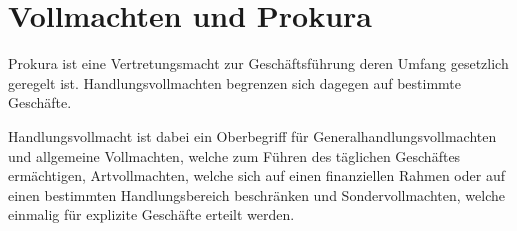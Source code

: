 \section{Vollmachten und Prokura}

Prokura ist eine Vertretungsmacht zur Geschäftsführung deren Umfang gesetzlich geregelt ist. Handlungsvollmachten begrenzen sich dagegen auf bestimmte Geschäfte.

Handlungsvollmacht ist dabei ein Oberbegriff für Generalhandlungsvollmachten und allgemeine Vollmachten, welche zum Führen des täglichen Geschäftes ermächtigen, Artvollmachten, welche sich auf einen finanziellen Rahmen oder auf einen bestimmten Handlungsbereich beschränken und Sondervollmachten, welche einmalig für explizite Geschäfte erteilt werden.